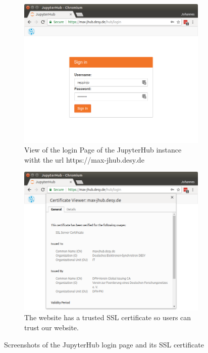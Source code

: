 \documentclass[10pt]{scrartcl}
\begin{document}
\begin{figure}
  \centering
  \begin{subfigure}{0.45\textwidth} %
	  \includegraphics[width=\textwidth]{figures/jhub001.png}
	  \caption{View of the login Page of the JupyterHub instance witht the url https://max-jhub.desy.de} %
  \end{subfigure}
  \vspace{1em} %
  \begin{subfigure}{0.45\textwidth} %
	  \includegraphics[width=\textwidth]{figures/jhub002.png}
	  \caption{The website has a trusted SSL certificate so users can trust our website.} %
  \end{subfigure}
  \caption{Screenshots of the JupyterHub login page and its SSL certificate}
  \label{fig:jhub_start}
\end{figure}
\end{document}
